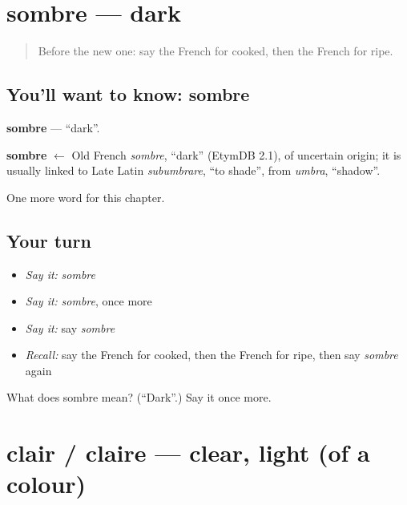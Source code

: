 \section[sombre]{sombre — dark}

\label{lesson:FR-C192-sombre}



\begin{quote}
Before the new one: say the French for cooked, then the French for ripe.
\end{quote}

\subsection*{You'll want to know: sombre}
\textbf{sombre} — \textquotedblleft{}dark\textquotedblright{}.

\begin{cousinweb}
\textbf{sombre} $\leftarrow$ Old French \emph{sombre}, \textquotedblleft{}dark\textquotedblright{} (EtymDB 2.1), of uncertain origin; it is usually linked to Late Latin \emph{subumbrare}, \textquotedblleft{}to shade\textquotedblright{}, from \emph{umbra}, \textquotedblleft{}shadow\textquotedblright{}.
\end{cousinweb}

\begin{grammarlens}[title={What you've built}]
One more word for this chapter.
\end{grammarlens}

\subsection*{Your turn}
\begin{itemize}
\raggedright
  \item \emph{Say it:} \emph{sombre}
  \item \emph{Say it:} \emph{sombre}, once more
  \item \emph{Say it:} say \emph{sombre}
  \item \emph{Recall:} say the French for cooked, then the French for ripe, then say \emph{sombre} again
\end{itemize}

\begin{tcolorbox}[breakable,colback=teal!4,colframe=teal!35!black,title={Before you move on}]
What does sombre mean? (\textquotedblleft{}Dark\textquotedblright{}.) Say it once more.
\end{tcolorbox}
\section[clair / claire]{clair / claire — clear, light (of a colour)}

